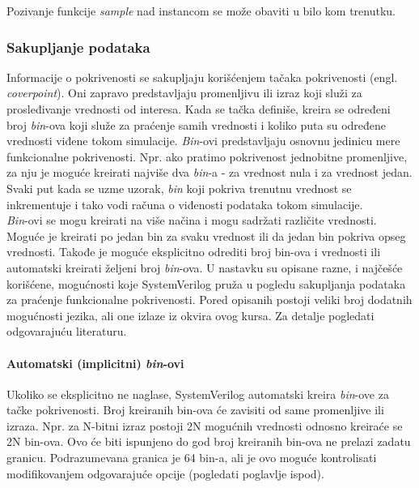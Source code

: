Pozivanje funkcije \emph{sample} nad instancom se može obaviti u bilo kom
trenutku.

\subsubsection{Sakupljanje podataka}

Informacije o pokrivenosti se sakupljaju korišćenjem tačaka pokrivenosti (engl.
\emph{coverpoint}). Oni zapravo predstavljaju promenljivu ili izraz koji služi
za prosleđivanje vrednosti od interesa. Kada se tačka definiše, kreira se
određeni broj \emph{bin}-ova koji služe za praćenje samih vrednosti i koliko
puta su određene vrednosti viđene tokom simulacije. \emph{Bin}-ovi
predstavljaju osnovnu jedinicu mere funkcionalne pokrivenosti. Npr. ako pratimo
pokrivenost jednobitne promenljive, za nju je moguće kreirati najviše dva
\emph{bin}-a - za vrednost nula i za vrednost jedan. Svaki put kada se uzme
uzorak, \emph{bin} koji pokriva trenutnu vrednost se inkrementuje i tako vodi
računa o viđenosti podataka tokom simulacije.\\

\emph{Bin}-ovi se mogu kreirati na više načina i mogu sadržati različite
vrednosti. Moguće je kreirati po jedan bin za svaku vrednost ili da jedan bin
pokriva opseg vrednosti. Takođe je moguće eksplicitno odrediti broj bin-ova i
vrednosti ili automatski kreirati željeni broj \emph{bin}-ova. U nastavku su
opisane razne, i najčešće korišćene, mogućnosti koje SystemVerilog pruža u
pogledu sakupljanja podataka za praćenje funkcionalne pokrivenosti. Pored
opisanih postoji veliki broj dodatnih mogućnosti jezika, ali one izlaze iz
okvira ovog kursa. Za detalje pogledati odgovarajuću literaturu.\\

\paragraph{Automatski (implicitni) \emph{bin}-ovi}

Ukoliko se eksplicitno ne naglase, SystemVerilog automatski kreira
\emph{bin}-ove za tačke pokrivenosti. Broj kreiranih bin-ova će zavisiti od same
promenljive ili izraza. Npr. za N-bitni izraz postoji 2N mogućnih vrednosti
odnosno kreiraće se 2N bin-ova. Ovo će biti ispunjeno do god broj kreiranih
bin-ova ne prelazi zadatu granicu. Podrazumevana granica je 64 bin-a, ali je ovo
moguće kontrolisati modifikovanjem odgovarajuće opcije (pogledati poglavlje
ispod).\\

